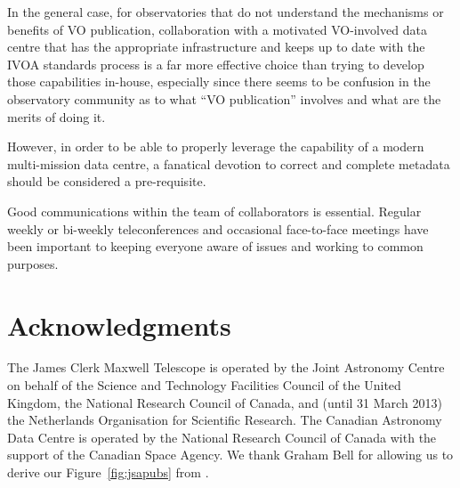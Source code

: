 \documentclass[final,authoryear,5p,times,twocolumn]{elsarticle}
\begin{document}
In the general case, for observatories that do not understand the
mechanisms or benefits of VO publication, collaboration with a
motivated VO-involved data centre that has the appropriate
infrastructure and keeps up to date with the IVOA standards process is
a far more effective choice than trying to develop those capabilities
in-house, especially since there seems to be confusion in the
observatory community as to what ``VO publication'' involves and what
are the merits of doing it.

However, in order to be able to properly leverage the capability of a
modern multi-mission data centre, a fanatical devotion to correct and
complete metadata should be considered a pre-requisite.

Good communications within the team of collaborators is essential.  Regular
weekly or bi-weekly teleconferences and occasional face-to-face meetings
have been important to keeping everyone aware of issues and working to
common purposes.

\section*{Acknowledgments}

The James Clerk Maxwell Telescope is operated by the Joint Astronomy
Centre on behalf of the Science and Technology Facilities Council of
the United Kingdom, the National Research Council of Canada, and
(until 31 March 2013) the Netherlands Organisation for Scientific
Research.  The Canadian Astronomy Data Centre is operated by the
National Research Council of Canada with the support of the Canadian
Space Agency. We thank Graham Bell for allowing us to derive our
Figure~\ref{fig:jsapubs} from \citet{2014SPIE9152-93}.
\end{document}
